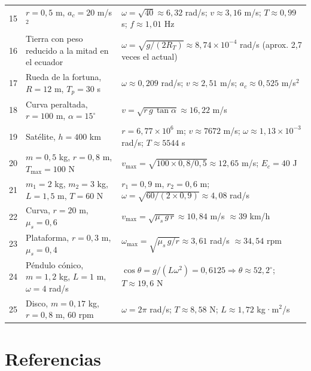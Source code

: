 \documentclass[12pt]{article}
\begin{document}
\begin{longtable}{c p{5.5cm} p{9cm}}
15 & \(r = 0{,}5\) m, \(a_c = 20\) m/s\(^2\) &
  \(\omega = \sqrt{40} \approx 6{,}32\) rad/s; \(v \approx 3{,}16\) m/s; \(T \approx 0{,}99\) s; \(f \approx 1{,}01\) Hz \\
16 & Tierra con peso reducido a la mitad en el ecuador &
  \(\omega = \sqrt{g/(2R_T)} \approx 8{,}74 \times 10^{-4}\) rad/s (aprox. 2{,}7 veces el actual) \\
17 & Rueda de la fortuna, \(R = 12\) m, \(T_p = 30\) s &
  \(\omega \approx 0{,}209\) rad/s; \(v \approx 2{,}51\) m/s; \(a_c \approx 0{,}525\) m/s\(^2\) \\
\midrule
18 & Curva peraltada, \(r = 100\) m, \(\alpha = 15^\circ\) &
  \(v = \sqrt{r\,g\,\tan\alpha} \approx 16{,}22\) m/s \\
19 & Satélite, \(h = 400\) km &
  \(r = 6{,}77 \times 10^6\) m; \(v \approx 7672\) m/s; \(\omega \approx 1{,}13 \times 10^{-3}\) rad/s; \(T \approx 5544\) s \\
20 & \(m = 0{,}5\) kg, \(r = 0{,}8\) m, \(T_{\max} = 100\) N &
  \(v_{\max} = \sqrt{100 \times 0{,}8 / 0{,}5} \approx 12{,}65\) m/s; \(E_c = 40\) J \\
21 & \(m_1 = 2\) kg, \(m_2 = 3\) kg, \(L = 1{,}5\) m, \(T = 60\) N &
  \(r_1 = 0{,}9\) m, \(r_2 = 0{,}6\) m; \(\omega = \sqrt{60/(2 \times 0{,}9)} \approx 4{,}08\) rad/s \\
22 & Curva, \(r = 20\) m, \(\mu_s = 0{,}6\) &
  \(v_{\max} = \sqrt{\mu_s\,g\,r} \approx 10{,}84\) m/s \(\approx 39\) km/h \\
23 & Plataforma, \(r = 0{,}3\) m, \(\mu_s = 0{,}4\) &
  \(\omega_{\max} = \sqrt{\mu_s\,g/r} \approx 3{,}61\) rad/s \(\approx 34{,}54\) rpm \\
24 & Péndulo cónico, \(m = 1{,}2\) kg, \(L = 1\) m, \(\omega = 4\) rad/s &
  \(\cos\theta = g/(L\omega^2) = 0{,}6125 \Rightarrow \theta \approx 52{,}2^\circ\); \(T \approx 19{,}6\) N \\
25 & Disco, \(m = 0{,}17\) kg, \(r = 0{,}8\) m, 60 rpm &
  \(\omega = 2\pi\) rad/s; \(T \approx 8{,}58\) N; \(L \approx 1{,}72\) kg·m\(^2\)/s \\
\bottomrule
\end{longtable}
\normalsize

\newpage

\section*{Referencias}
\end{document}
